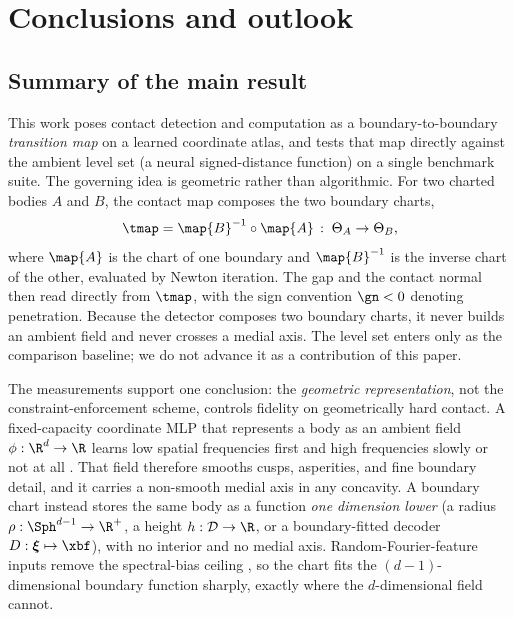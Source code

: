 \section{Conclusions and outlook}\label{sec:concl}

\subsection{Summary of the main result}\label{sec:concl-thesis}

This work poses contact detection and computation as a boundary-to-boundary
\emph{transition map} on a learned coordinate atlas, and tests that map directly against the
ambient level set (a neural signed-distance function) on a single benchmark suite. The
governing idea is geometric rather than algorithmic. For two charted bodies $A$ and $B$, the
contact map composes the two boundary charts,
%
\begin{equation}\label{eq:concl-transition}
  \tmap = \map{B}^{-1}\circ\map{A}\,:\;\Theta_A \to \Theta_B,
\end{equation}
%
where $\map{A}$ is the chart of one boundary and $\map{B}^{-1}$ is the inverse chart of the
other, evaluated by Newton iteration. The gap and the contact normal then read directly from
$\tmap$, with the sign convention $\gn<0$ denoting penetration. Because the detector composes
two boundary charts, it never builds an ambient field and never crosses a medial axis. The
level set enters only as the comparison baseline; we do not advance it as a contribution of
this paper.

The measurements support one conclusion: the \emph{geometric representation}, not the
constraint-enforcement scheme, controls fidelity on geometrically hard contact. A
fixed-capacity coordinate MLP that represents a body as an ambient field $\phi:\R^d\to\R$
learns low spatial frequencies first and high frequencies slowly or not at all
\citep{rahaman2019spectral,tancik2020fourier}. That field therefore smooths cusps, asperities,
and fine boundary detail, and it carries a non-smooth medial axis in any concavity. A boundary
chart instead stores the same body as a function \emph{one dimension lower} (a radius
$\rho:\Sph^{d-1}\to\R^+$, a height $h:\mathcal D\to\R$, or a boundary-fitted decoder
$D:\boldsymbol\xi\mapsto\xbf$), with no interior and no medial axis. Random-Fourier-feature
inputs remove the spectral-bias ceiling \citep{tancik2020fourier,mildenhall2020nerf}, so the
chart fits the $(d{-}1)$-dimensional boundary function sharply, exactly where the
$d$-dimensional field cannot.

